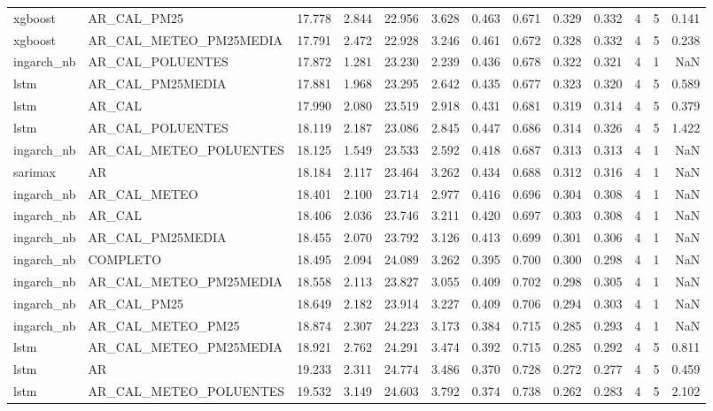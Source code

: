 \begin{tabular}{llrrrrrrrrrrr}
xgboost & AR_CAL_PM25 & 17.778 & 2.844 & 22.956 & 3.628 & 0.463 & 0.671 & 0.329 & 0.332 & 4 & 5 & 0.141 \\
xgboost & AR_CAL_METEO_PM25MEDIA & 17.791 & 2.472 & 22.928 & 3.246 & 0.461 & 0.672 & 0.328 & 0.332 & 4 & 5 & 0.238 \\
ingarch_nb & AR_CAL_POLUENTES & 17.872 & 1.281 & 23.230 & 2.239 & 0.436 & 0.678 & 0.322 & 0.321 & 4 & 1 & NaN \\
lstm & AR_CAL_PM25MEDIA & 17.881 & 1.968 & 23.295 & 2.642 & 0.435 & 0.677 & 0.323 & 0.320 & 4 & 5 & 0.589 \\
lstm & AR_CAL & 17.990 & 2.080 & 23.519 & 2.918 & 0.431 & 0.681 & 0.319 & 0.314 & 4 & 5 & 0.379 \\
lstm & AR_CAL_POLUENTES & 18.119 & 2.187 & 23.086 & 2.845 & 0.447 & 0.686 & 0.314 & 0.326 & 4 & 5 & 1.422 \\
ingarch_nb & AR_CAL_METEO_POLUENTES & 18.125 & 1.549 & 23.533 & 2.592 & 0.418 & 0.687 & 0.313 & 0.313 & 4 & 1 & NaN \\
sarimax & AR & 18.184 & 2.117 & 23.464 & 3.262 & 0.434 & 0.688 & 0.312 & 0.316 & 4 & 1 & NaN \\
ingarch_nb & AR_CAL_METEO & 18.401 & 2.100 & 23.714 & 2.977 & 0.416 & 0.696 & 0.304 & 0.308 & 4 & 1 & NaN \\
ingarch_nb & AR_CAL & 18.406 & 2.036 & 23.746 & 3.211 & 0.420 & 0.697 & 0.303 & 0.308 & 4 & 1 & NaN \\
ingarch_nb & AR_CAL_PM25MEDIA & 18.455 & 2.070 & 23.792 & 3.126 & 0.413 & 0.699 & 0.301 & 0.306 & 4 & 1 & NaN \\
ingarch_nb & COMPLETO & 18.495 & 2.094 & 24.089 & 3.262 & 0.395 & 0.700 & 0.300 & 0.298 & 4 & 1 & NaN \\
ingarch_nb & AR_CAL_METEO_PM25MEDIA & 18.558 & 2.113 & 23.827 & 3.055 & 0.409 & 0.702 & 0.298 & 0.305 & 4 & 1 & NaN \\
ingarch_nb & AR_CAL_PM25 & 18.649 & 2.182 & 23.914 & 3.227 & 0.409 & 0.706 & 0.294 & 0.303 & 4 & 1 & NaN \\
ingarch_nb & AR_CAL_METEO_PM25 & 18.874 & 2.307 & 24.223 & 3.173 & 0.384 & 0.715 & 0.285 & 0.293 & 4 & 1 & NaN \\
lstm & AR_CAL_METEO_PM25MEDIA & 18.921 & 2.762 & 24.291 & 3.474 & 0.392 & 0.715 & 0.285 & 0.292 & 4 & 5 & 0.811 \\
lstm & AR & 19.233 & 2.311 & 24.774 & 3.486 & 0.370 & 0.728 & 0.272 & 0.277 & 4 & 5 & 0.459 \\
lstm & AR_CAL_METEO_POLUENTES & 19.532 & 3.149 & 24.603 & 3.792 & 0.374 & 0.738 & 0.262 & 0.283 & 4 & 5 & 2.102 \\

\end{tabular}
